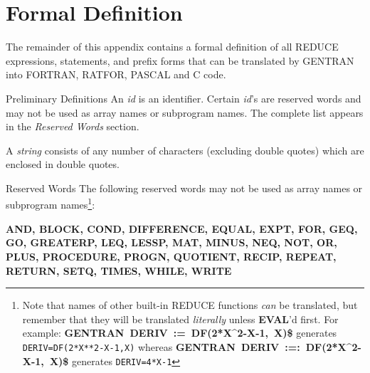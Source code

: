 \section{Formal Definition}
The remainder of this appendix contains a formal definition of all
REDUCE expressions, statements, and prefix forms that can be translated by
GENTRAN into FORTRAN, RATFOR, PASCAL and C code.

\begin{describe}{Preliminary Definitions}
An {\it id\/} is an identifier.  Certain {\it id\/}'s are reserved words
and may not be used as array names or subprogram names.  The
complete list appears in the {\it Reserved Words\/} section.

A {\it string\/} consists of any number of characters (excluding double
quotes) which are enclosed in double quotes.
\end{describe}

\begin{describe}{Reserved Words}
The following reserved words may not be used as array names or
subprogram names\footnote{Note that names of other built-in REDUCE functions
{\it can\/} be translated, but remember that they will be translated
{\it literally\/} unless {\bf EVAL}'d first.  For example:
{\bf GENTRAN~DERIV~:=~DF(2*X\^{}2-X-1,~X)\$}
generates {\tt DERIV=DF(2*X**2-X-1,X)}
whereas
{\bf GENTRAN~DERIV~:=:~DF(2*X\^{}2-X-1,~X)\$}
generates {\tt DERIV=4*X-1} }:

{\bf AND, BLOCK, COND, DIFFERENCE, EQUAL, EXPT, FOR, GEQ,
GO, GREATERP, LEQ, LESSP, MAT, MINUS, NEQ, NOT, OR,
PLUS, PROCEDURE, PROGN, QUOTIENT, RECIP, REPEAT,
RETURN, SETQ, TIMES, WHILE, WRITE}
\end{describe} 

